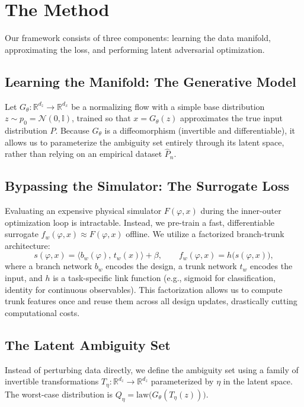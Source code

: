 \documentclass[11pt]{article}
\newcommand{\R}{\mathbb{R}}
\newcommand{\design}{\varphi}
\newcommand{\latent}{z}
\newcommand{\surr}{f_w}
\newcommand{\base}{p_0}
\begin{document}
\section{The Method}
\label{sec:method}

Our framework consists of three components: learning the data manifold, approximating the loss, and performing latent adversarial optimization.

\subsection{Learning the Manifold: The Generative Model}
Let $G_\theta: \R^{d_z} \to \R^{d_x}$ be a normalizing flow with a simple base distribution $\latent \sim \base = \mathcal N(0,\mathbb{I})$, trained so that $x = G_\theta(\latent)$ approximates the true input distribution $P$. Because $G_\theta$ is a diffeomorphism (invertible and differentiable), it allows us to parameterize the ambiguity set entirely through its latent space, rather than relying on an empirical dataset $\hat P_n$.

\subsection{Bypassing the Simulator: The Surrogate Loss}
Evaluating an expensive physical simulator $F(\design,x)$ during the inner-outer optimization loop is intractable. Instead, we pre-train a fast, differentiable surrogate $\surr(\design, x) \approx F(\design,x)$ offline. We utilize a factorized branch-trunk architecture:
\begin{equation}
  \label{eq:factorized}
  s(\design, x) = \langle b_w(\design),\, t_w(x)\rangle + \beta,
  \qquad \surr(\design,x) = h\big(s(\design,x)\big),
\end{equation}
where a branch network $b_w$ encodes the design, a trunk network $t_w$ encodes the input, and $h$ is a task-specific link function (e.g., sigmoid for classification, identity for continuous observables). This factorization allows us to compute trunk features once and reuse them across all design updates, drastically cutting computational costs.

\subsection{The Latent Ambiguity Set}
Instead of perturbing data directly, we define the ambiguity set using a family of invertible transformations $T_\eta : \R^{d_z} \to \R^{d_z}$ parameterized by $\eta$ in the latent space. The worst-case distribution is $Q_\eta = \mathrm{law}\big(G_\theta(T_\eta(\latent))\big)$. 
\end{document}
